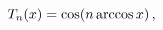 \[\mathop{T_{n}\/}\nolimits\!\left(x\right)=\mathop{\cos\/}\nolimits\!\left(n%
\mathop{\mathrm{arccos}\/}\nolimits x\right),\]